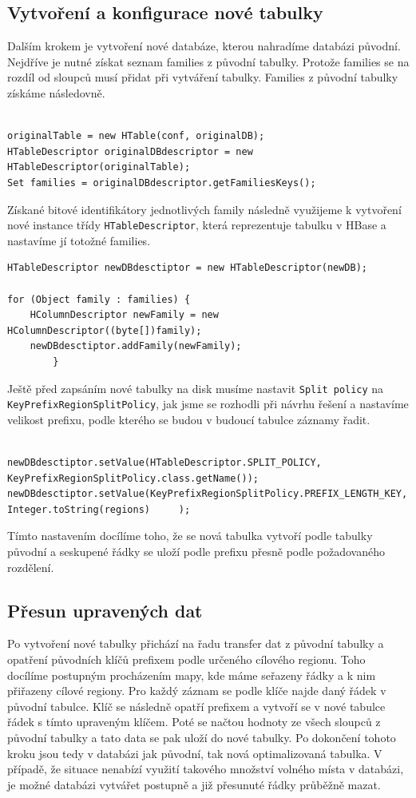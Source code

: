 \documentclass[thesis=M,czech]{FITthesis}[2012/06/26]
\begin{document}
\subsection{Vytvoření a konfigurace nové tabulky}
Dalším krokem je vytvoření nové databáze, kterou nahradíme databázi původní. Nejdříve je nutné získat seznam families z původní tabulky. Protože families se na rozdíl od sloupců musí přidat při vytváření tabulky. Families z původní tabulky získáme následovně. 


\begin{lstlisting}[frame=single]  % Start your code-block

originalTable = new HTable(conf, originalDB);
HTableDescriptor originalDBdescriptor = new HTableDescriptor(originalTable);
Set families = originalDBdescriptor.getFamiliesKeys();
\end{lstlisting}
Získané bitové identifikátory jednotlivých family následně využijeme k vytvoření nové instance třídy \texttt{HTableDescriptor}, která reprezentuje tabulku v HBase a nastavíme jí totožné families.
\begin{lstlisting}[frame=single]  % Start your code-block
HTableDescriptor newDBdesctiptor = new HTableDescriptor(newDB);

for (Object family : families) {
    HColumnDescriptor newFamily = new HColumnDescriptor((byte[])family);
    newDBdesctiptor.addFamily(newFamily);
        }
\end{lstlisting}
Ještě před zapsáním nové tabulky na disk musíme nastavit \texttt{Split policy}  na \texttt{KeyPrefixRegionSplitPolicy}, jak jsme se rozhodli při návrhu řešení a nastavíme velikost prefixu, podle kterého se budou v budoucí tabulce záznamy řadit.
\begin{lstlisting}[frame=single]  % Start your code-block

newDBdesctiptor.setValue(HTableDescriptor.SPLIT_POLICY, KeyPrefixRegionSplitPolicy.class.getName());
newDBdesctiptor.setValue(KeyPrefixRegionSplitPolicy.PREFIX_LENGTH_KEY, 
Integer.toString(regions)     );
\end{lstlisting}

Tímto nastavením docílíme toho, že se nová tabulka vytvoří podle tabulky původní a seskupené řádky se uloží podle prefixu přesně podle požadovaného rozdělení.
\subsection{Přesun upravených dat}
Po vytvoření nové tabulky přichází na řadu transfer dat z původní tabulky a opatření původních klíčů prefixem podle určeného cílového regionu. Toho docílíme postupným procházením mapy, kde máme seřazeny řádky a k nim přiřazeny cílové regiony. Pro každý záznam se podle klíče najde daný řádek v původní tabulce. Klíč se následně opatří prefixem a vytvoří se v nové tabulce řádek s tímto upraveným klíčem. Poté se načtou hodnoty ze všech sloupců z původní tabulky a tato data se pak uloží do nové tabulky. Po dokončení tohoto kroku jsou tedy v databázi jak původní, tak nová optimalizovaná tabulka. V případě, že situace nenabízí využití takového množství volného místa v databázi, je možné databázi vytvářet postupně a již přesunuté řádky průběžně mazat. 
\end{document}
